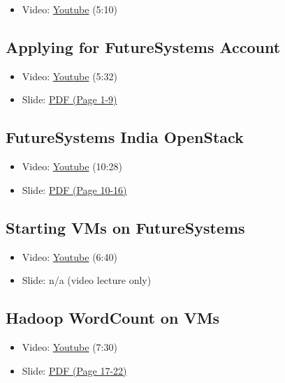 \begin{itemize}
\tightlist
\item
  Video: \href{https://www.youtube.com/watch?v=zxoqRdvXM28}{Youtube}
  (5:10)
\end{itemize}

\subsection{Applying for FutureSystems
Account}\label{applying-for-futuresystems-account}

\begin{itemize}
\tightlist
\item
  Video: \href{https://www.youtube.com/watch?v=98ERlWi3k3U}{Youtube}
  (5:32)
\item
  Slide:
  \href{https://drive.google.com/open?id=0B88HKpainTSfZENxeUlOcVFUTkU}{PDF
  (Page 1-9)}
\end{itemize}

\subsection{FutureSystems India
OpenStack}\label{futuresystems-india-openstack}

\begin{itemize}
\tightlist
\item
  Video: \href{https://www.youtube.com/watch?v=hyKYTpNmJZc}{Youtube}
  (10:28)
\item
  Slide:
  \href{https://drive.google.com/open?id=0B88HKpainTSfZENxeUlOcVFUTkU}{PDF
  (Page 10-16)}
\end{itemize}

\subsection{Starting VMs on
FutureSystems}\label{starting-vms-on-futuresystems}

\begin{itemize}
\tightlist
\item
  Video: \href{https://www.youtube.com/watch?v=RPnhJs4IcfQ}{Youtube}
  (6:40)
\item
  Slide: n/a (video lecture only)
\end{itemize}

\subsection{Hadoop WordCount on VMs}\label{hadoop-wordcount-on-vms}

\begin{itemize}
\tightlist
\item
  Video: \href{https://www.youtube.com/watch?v=1TrjmcPHrRU}{Youtube}
  (7:30)
\item
  Slide:
  \href{https://drive.google.com/open?id=0B88HKpainTSfZENxeUlOcVFUTkU}{PDF
  (Page 17-22)}
\end{itemize}
